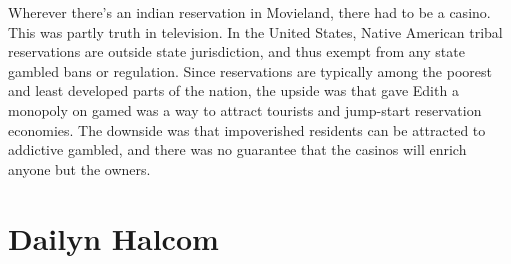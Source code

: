 \documentclass[12pt]{book}
\begin{document}
Wherever there's an indian reservation in Movieland, there had to be a casino. This was partly truth in television. In the United States, Native American tribal reservations are outside state jurisdiction, and thus exempt from any state gambled bans or regulation. Since reservations are typically among the poorest and least developed parts of the nation, the upside was that gave Edith a monopoly on gamed was a way to attract tourists and jump-start reservation economies. The downside was that impoverished residents can be attracted to addictive gambled, and there was no guarantee that the casinos will enrich anyone but the owners.



\chapter{Dailyn Halcom}
\end{document}
